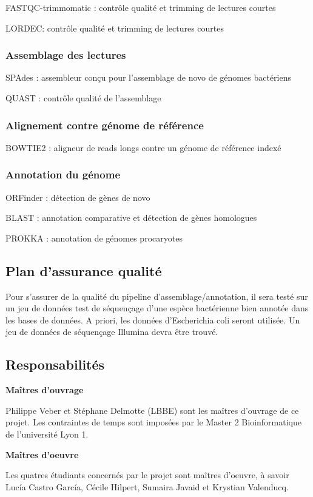 \forceindent FASTQC-trimmomatic : contrôle qualité et trimming de lectures courtes

\forceindent LORDEC: contrôle qualité et trimming de lectures courtes 


\subsubsection{Assemblage des lectures}

\forceindent SPAdes : assembleur conçu pour l'assemblage de novo de génomes bactériens

\forceindent QUAST : contrôle qualité de l'assemblage

\subsubsection{Alignement contre génome de référence}

\forceindent BOWTIE2 : aligneur de reads longs contre un génome de référence indexé

\subsubsection{Annotation du génome}

\forceindent ORFinder : détection de gènes de novo

\forceindent BLAST : annotation comparative et détection de gènes homologues

\forceindent PROKKA : annotation de génomes procaryotes

\subsection{Plan d'assurance qualité}

Pour s’assurer de la qualité du pipeline d’assemblage/annotation, il sera testé sur un jeu de données test de séquençage d’une espèce bactérienne bien annotée dans les bases de données. A priori, les données d’Escherichia coli seront utilisée. Un jeu de données de séquençage Illumina devra être trouvé.


\subsection{Responsabilités}
\textbf{Maîtres d'ouvrage}

Philippe Veber et Stéphane Delmotte (LBBE) sont les maîtres d'ouvrage de ce projet. Les contraintes de temps sont imposées par le Master 2 Bioinformatique de l’université Lyon 1.

\textbf{Maîtres d'oeuvre}

Les quatres étudiants concernés par le projet sont maîtres d’oeuvre, à savoir Lucía Castro García, Cécile Hilpert, Sumaira Javaid et Krystian Valenducq.
